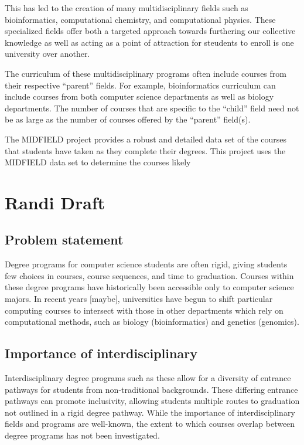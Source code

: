 \documentclass[
  journal,
]{IEEEtran}%
\begin{document}
This has led to the creation of many multidisciplinary fields such as
bioinformatics, computational chemistry, and computational physics.
These specialized fields offer both a targeted approach towards
furthering our collective knowledge as well as acting as a point of
attraction for steudents to enroll is one university over another.

The curriculum of these multidisciplinary programs often include courses
from their respective ``parent'' fields. For example, bioinformatics
curriculum can include courses from both computer science departments as
well as biology departments. The number of courses that are specific to
the ``child'' field need not be as large as the number of courses
offered by the ``parent'' field(s).

The MIDFIELD project provides a robust and detailed data set of the
courses that students have taken as they complete their degrees. This
project uses the MIDFIELD data set to determine the courses likely

\hypertarget{randi-draft}{%
\section{Randi Draft}\label{randi-draft}}

\hypertarget{problem-statement}{%
\subsection{Problem statement}\label{problem-statement}}

Degree programs for computer science students are often rigid, giving
students few choices in courses, course sequences, and time to
graduation. Courses within these degree programs have historically been
accessible only to computer science majors. In recent years {[}maybe{]},
universities have begun to shift particular computing courses to
intersect with those in other departments which rely on computational
methods, such as biology (bioinformatics) and genetics (genomics).

\hypertarget{importance-of-interdisciplinary}{%
\subsection{Importance of
interdisciplinary}\label{importance-of-interdisciplinary}}

Interdisciplinary degree programs such as these allow for a diversity of
entrance pathways for students from non-traditional backgrounds. These
differing entrance pathways can promote inclusivity, allowing students
multiple routes to graduation not outlined in a rigid degree pathway.
While the importance of interdisciplinary fields and programs are
well-known, the extent to which courses overlap between degree programs
has not been investigated.
\end{document}
